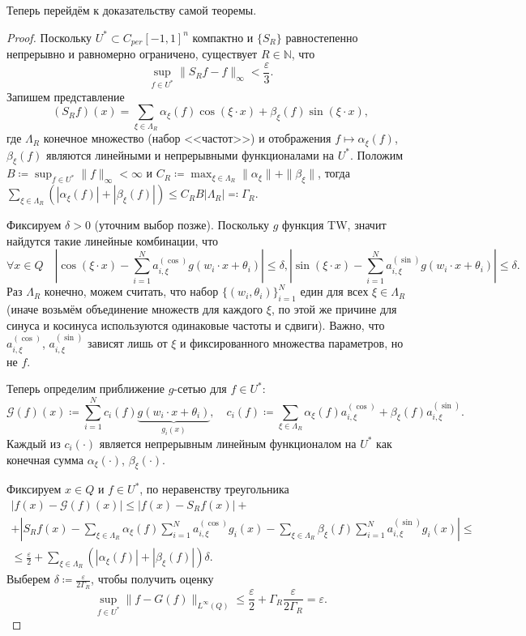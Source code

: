 \documentclass[../NDCNNAI_main.tex]{subfiles}
\begin{document}
Теперь перейдём к доказательству самой теоремы.
\begin{proof}
  Поскольку $U^* \subset C_{per}[-1, 1]^n$ компактно и $\{S_R\}$ равностепенно непрерывно и равномерно ограничено, существует $R \in \mathbb{N}$, что
  $$\sup_{f \in U^*} \|S_R f - f\|_\infty < \frac{\varepsilon}{3}.$$
  Запишем представление
  $$(S_R f)(x) = \sum_{\xi \in \Lambda_R} \alpha_\xi(f) \cos(\xi \cdot x) + \beta_\xi(f) \sin(\xi \cdot x),$$
  где $\Lambda_R$ конечное множество (набор <<частот>>) и отображения $f \mapsto \alpha_\xi(f)$, $\beta_\xi(f)$ являются линейными и непрерывными функционалами на $U^*$.
  Положим $B \coloneq \sup_{f \in U^*} \|f\|_\infty < \infty$ и $C_R \coloneq \max_{\xi \in \Lambda_R} \|\alpha_\xi\| + \|\beta_\xi\|$, тогда  
  $\sum_{\xi \in \Lambda_R} \left(|\alpha_\xi(f)| + |\beta_\xi(f)|\right) \le C_R B |\Lambda_R| \eqcolon \Gamma_R$.

  Фиксируем $\delta > 0$ (уточним выбор позже).
  Поскольку $g$ функция TW, значит найдутся такие линейные комбинации, что
  $$\forall x \in Q\quad\left|\cos(\xi \cdot x) - \sum_{i=1}^N a_{i,\xi}^{(\cos)} g(w_i \cdot x + \theta_i)\right| \le \delta, \left|\sin(\xi \cdot x) - \sum_{i=1}^N a_{i,\xi}^{(\sin)} g(w_i \cdot x + \theta_i)\right| \le \delta.$$
  Раз $\Lambda_R$ конечно, можем считать, что набор $\{(w_i, \theta_i)\}_{i=1}^N$ един для всех $\xi \in \Lambda_R$ (иначе возьмём объединение множеств для каждого $\xi$, по этой же причине для синуса и косинуса используются одинаковые частоты и сдвиги).
  Важно, что $a_{i,\xi}^{(\cos)}$, $a_{i,\xi}^{(\sin)}$ зависят лишь от $\xi$ и фиксированного множества параметров, но не $f$.

  Теперь определим приближение $g$-сетью для $f \in U^*$:
  $$\mathcal{G}(f)(x) \coloneq \sum_{i=1}^{N} c_i(f) \underbrace{g(w_i \cdot x + \theta_i)}_{g_i(x)}, \quad c_i(f) \coloneq \sum_{\xi \in \Lambda_R} \alpha_\xi(f) a_{i,\xi}^{(\cos)} + \beta_\xi(f) a_{i,\xi}^{(\sin)}.$$
  Каждый из $c_i(\cdot)$ является непрерывным линейным функционалом на $U^*$ как конечная сумма $\alpha_\xi(\cdot)$, $\beta_\xi(\cdot)$.

  Фиксируем $x \in Q$ и $f \in U^*$, по неравенству треугольника
  \begin{multline*}
    |f(x) - \mathcal{G}(f)(x)| \le |f(x) - S_R f(x)| +\\
    + \left|S_R f(x) - \sum_{\xi \in \Lambda_R} \alpha_\xi(f) \sum_{i = 1}^N a_{i,\xi}^{(\cos)} g_i(x) - \sum_{\xi \in \Lambda_R} \beta_\xi(f) \sum_{i = 1}^N a_{i,\xi}^{(\sin)} g_i(x)\right| \le \\
    \le \frac{\varepsilon}{2} + \sum_{\xi \in \Lambda_R} \left(|\alpha_\xi(f)| + |\beta_\xi(f)|\right) \delta.
  \end{multline*}
  Выберем $\delta \coloneq \frac{\varepsilon}{2\Gamma_R}$, чтобы получить оценку
  $$\sup_{f \in U^*} \|f - G(f)\|_{L^\infty(Q)} \le \frac{\varepsilon}{2} + \Gamma_R\frac{\varepsilon}{2\Gamma_R} = \varepsilon.$$


\end{proof}
\end{document}
